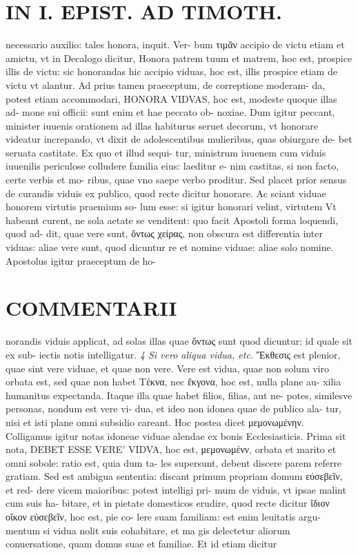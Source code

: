 \documentclass{article}
\begin{document}
\begin{pages}
\section*{IN I. EPIST. AD TIMOTH. }\pstart necessario auxilio: tales honora, inquit. Ver- bum τιμᾶν accipio de victu etiam et amictu, vt in Decalogo dicitur, Honora patrem tuum et matrem, hoc est, prospice illis de victu: sic honorandas hic accipio viduas, hoc est, illis prospice etiam de victu vt alantur. Ad prius tamen praeceptum, de correptione moderam- da, potest etiam accommodari, HONORA VIDVAS, hoc est, modeste quoque illas ad- mone sui officii: sunt enim et hae peccato ob- noxiae. Dum igitur peccant, minister iuuenis orationem ad illas habiturus seruet decorum, vt honorare videatur increpando, vt dixit de adolescentibus mulieribus, quas obiurgare de- bet seruata castitate. Ex quo et illud sequi- tur, ministrum iuuenem cum viduis iuuenilis periculose colludere familia eius: laeditur e- nim castitas, si non facto, certe verbis et mo- ribus, quae vno saepe verbo proditur.  \pend\pstart Sed placet prior sensus de curandis viduis ex publico, quod recte dicitur honorare. Ac sciant viduae honorem virtutis praemium so- lum esse: si igitur honorari velint, virtutem Vt habeant curent, ne sola aetate se venditent: quo facit Apostoli forma loquendi, quod ad- dit, quae vere sunt, ὄντως χείρας, non obscura est differentia inter viduas: aliae vere sunt, quod dicuntur re et nomine viduae: aliae solo nomine. Apostolus igitur praeceptum de ho-  \pend
\marginpar{[ p.121 ]}
\marginpar{[ p.122 ]}
\section*{COMMENTARII }\pstart norandis viduis applicat, ad solas illas quae ὄντως sunt quod dicuntur: id quale sit ex sub- iectis notis intelligatur.  \pend
\textit{4 Si vero aliqua vidua, etc. }\pstart Ἔκθεσις est plenior, quae sint vere viduae, et quae non vere. Vere est vidua, quae non solum viro orbata est, sed quae non habet Τέκνα, nec ἔκγονα, hoc est, nulla plane au- xilia humanitus expectanda.  \pend\pstart Itaque illa quae habet filios, filias, aut ne- potes, similesve personas, nondum est vere vi- dua, et ideo non idonea quae de publico ala- tur, nisi et isti plane omni subsidio careant. Hoc postea dicet μεμονωμένην. Colligamus igitur notas idoneae viduae alendae ex bonis Ecclesiasticis. Prima sit nota, DEBET ESSE VERE' VIDVA, hoc est, μεμονωμένν, orbata et marito et omni sobole: ratio est, quia dum ta- les supersunt, debent discere parem referre gratiam. Sed est ambigua sententia: discant primum propriam domum εύσεβεῖν, et red- dere vicem maioribus: potest intelligi pri- mum de viduis, vt ipsae malint cum suis ha- bitare, et in pietate domesticos erudire, quod recte dicitur ἴδιον οἴκον εὐσεβεῖν, hoc est, pie co- lere suam familiam: est enim leuitatis argu- mentum si vidua nolit suis cohabitare, et ma gis delectetur aliorum conuersatione, quam domus suae et familiae. Et id etiam dicitur  \pend

\end{pages}
\end{document}
